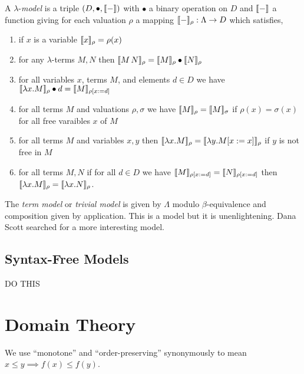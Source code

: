 \documentclass[12pt]{article}
\begin{document}
\begin{defn}
A $\lambda$-\textit{model} is a triple $(D, \bullet, \llbracket - \rrbracket)$ with $\bullet$ a binary operation on $D$ and $\llbracket - \rrbracket$ a function giving for each valuation $\rho$ a mapping $\llbracket - \rrbracket_\rho : \Lambda \to D$ which satisfies,
\begin{enumerate}
\item if $x$ is a variable $\llbracket x \rrbracket_\rho = \rho(x)$
\item for any $\lambda$-terms $M, N$ then $\llbracket M \, N \rrbracket_\rho = \llbracket M \rrbracket_{\rho} \bullet \llbracket N \rrbracket_\rho$
\item for all variables $x$, terms $M$, and elements $d \in D$ we have $\llbracket \lambda x . M \rrbracket_\rho \bullet d = \llbracket M \rrbracket_{\rho [x := d]}$
\item for all terms $M$ and valuations $\rho, \sigma$ we have $\llbracket M \rrbracket_\rho = \llbracket M \rrbracket_\sigma$ if $\rho(x) = \sigma(x)$ for all free varaibles $x$ of $M$
\item for all terms $M$ and variables $x,y$ then $\llbracket \lambda x . M \rrbracket_\rho = \llbracket \lambda y . M [x := x] \rrbracket_{\rho}$ if $y$ is not free in $M$
\item for all terms $M, N$ if for all $d \in D$ we have $\llbracket M \rrbracket_{\rho [x := d]} = \llbracket N \rrbracket_{\rho [x := d]}$ then $\llbracket \lambda x . M \rrbracket_\rho = \llbracket \lambda x . N \rrbracket_\rho$.
\end{enumerate}
\end{defn}

\begin{rmk}
The \textit{term model} or \textit{trivial model} is given by $\Lambda$ modulo $\beta$-equivalence and composition given by application. This is a model but it is unenlightening. Dana Scott searched for a more interesting model. 
\end{rmk}

\subsection{Syntax-Free Models}

DO THIS

\section{Domain Theory}

\begin{rmk}
We use ``monotone'' and ``order-preserving'' synonymously to mean $x \le y \implies f(x) \le f(y)$.
\end{rmk}
\end{document}
